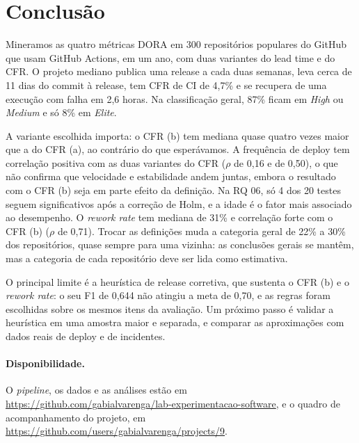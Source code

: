 \section{Conclusão}

Mineramos as quatro métricas DORA em 300 repositórios populares do GitHub que usam GitHub Actions, em um ano, com duas variantes do lead time e do CFR. O projeto mediano publica uma release a cada duas semanas, leva cerca de 11 dias do commit à release, tem CFR de CI de 4,7\% e se recupera de uma execução com falha em 2,6 horas. Na classificação geral, 87\% ficam em \textit{High} ou \textit{Medium} e só 8\% em \textit{Elite}.

A variante escolhida importa: o CFR (b) tem mediana quase quatro vezes maior que a do CFR (a), ao contrário do que esperávamos. A frequência de deploy tem correlação positiva com as duas variantes do CFR ($\rho$ de 0,16 e de 0,50), o que não confirma que velocidade e estabilidade andem juntas, embora o resultado com o CFR (b) seja em parte efeito da definição. Na RQ 06, só 4 dos 20 testes seguem significativos após a correção de Holm, e a idade é o fator mais associado ao desempenho. O \textit{rework rate} tem mediana de 31\% e correlação forte com o CFR (b) ($\rho$ de 0,71). Trocar as definições muda a categoria geral de 22\% a 30\% dos repositórios, quase sempre para uma vizinha: as conclusões gerais se mantêm, mas a categoria de cada repositório deve ser lida como estimativa.

O principal limite é a heurística de release corretiva, que sustenta o CFR (b) e o \textit{rework rate}: o seu F1 de 0,644 não atingiu a meta de 0,70, e as regras foram escolhidas sobre os mesmos itens da avaliação. Um próximo passo é validar a heurística em uma amostra maior e separada, e comparar as aproximações com dados reais de deploy e de incidentes.

\paragraph{Disponibilidade.} O \textit{pipeline}, os dados e as análises estão em \url{https://github.com/gabialvarenga/lab-experimentacao-software}, e o quadro de acompanhamento do projeto, em \url{https://github.com/users/gabialvarenga/projects/9}.
